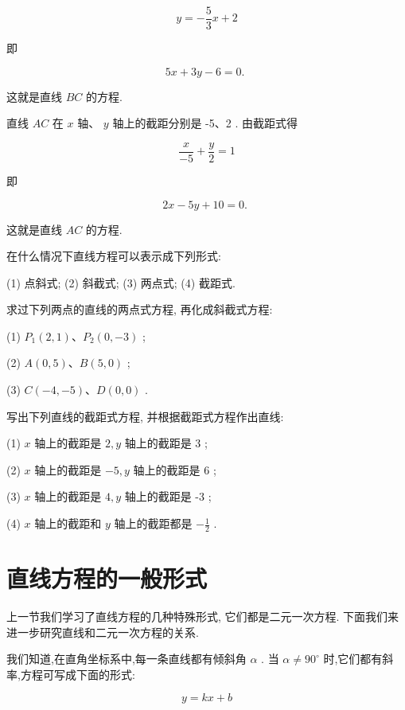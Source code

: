\documentclass[lang=cn,newtx,10pt,scheme=chinese]{elegantbook}
\begin{document}
\[
  y = - \frac{5}{3}x + 2
\]

即

\[
    {5x} + {3y} - 6 = 0\text{. }
\]

这就是直线 \({BC}\) 的方程.

直线 \({AC}\) 在 \(x\) 轴、 \(y\) 轴上的截距分别是 -5、2 . 由截距式得

\[
  \frac{x}{-5} + \frac{y}{2} = 1
\]

即

\[
    {2x} - {5y} + {10} = 0\text{. }
\]

这就是直线 \({AC}\) 的方程.

\begin{problemset}[练习]

\item 在什么情况下直线方程可以表示成下列形式:

(1) 点斜式; (2) 斜截式; (3) 两点式; (4) 截距式.

\item 求过下列两点的直线的两点式方程, 再化成斜截式方程:

(1) \({P}_{1}\left( {2,1}\right) \text{、}{P}_{2}\left( {0, - 3}\right)\) ;

(2) \(A\left( {0,5}\right) \text{、}B\left( {5,0}\right)\) ;

(3) \(C\left( {-4, - 5}\right) \text{、}D\left( {0,0}\right)\) .

\item 写出下列直线的截距式方程, 并根据截距式方程作出直线:

(1) \(x\) 轴上的截距是 \(2,y\) 轴上的截距是 3 ;

(2) \(x\) 轴上的截距是 \(- 5,y\) 轴上的截距是 6 ;

(3) \(x\) 轴上的截距是 \(4,y\) 轴上的截距是 -3 ;

(4) \(x\) 轴上的截距和 \(y\) 轴上的截距都是 \(- \frac{1}{2}\) .
\end{problemset}

\section{直线方程的一般形式}

上一节我们学习了直线方程的几种特殊形式, 它们都是二元一次方程. 下面我们来进一步研究直线和二元一次方程的关系.

我们知道,在直角坐标系中,每一条直线都有倾斜角 \(\alpha\) . 当 \(\alpha \neq {90}^{ \circ }\) 时,它们都有斜率,方程可写成下面的形式:

\[
  y = {kx} + b
\]
\end{document}
